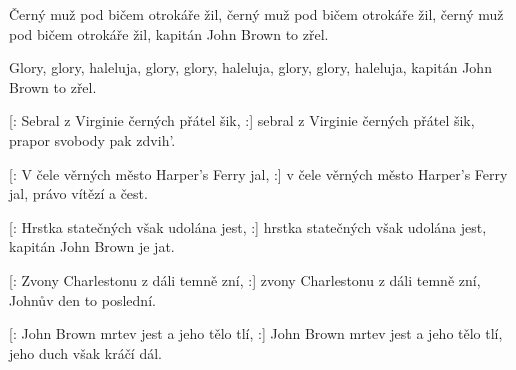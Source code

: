 
\beginverse{}
Černý muž pod bičem otrokáře žil,
černý muž pod bičem otrokáře žil,
černý muž pod bičem otrokáře žil,
kapitán John Brown to zřel.
\endverse{}

\beginchorus{}
Glory, glory, haleluja, glory, glory, haleluja,
glory, glory, haleluja, kapitán John Brown to zřel.
\endchorus{}

\beginverse{}
[: Sebral z Virginie černých přátel šik, :]
sebral z Virginie černých přátel šik,
prapor svobody pak zdvih'.
\endverse{}

\beginchorus{}
\phantom{}
\endchorus{}

\beginverse{}
[: V čele věrných město Harper's Ferry jal, :]
v čele věrných město Harper's Ferry jal,
právo vítězí a čest.
\endverse{}

\beginchorus{}
\phantom{}
\endchorus{}

\beginverse{}
[: Hrstka statečných však udolána jest, :]
hrstka statečných však udolána jest,
kapitán John Brown je jat.
\endverse{}

\beginchorus{}
\phantom{}
\endchorus{}

\beginverse{}
[: Zvony Charlestonu z dáli temně zní, :]
zvony Charlestonu z dáli temně zní,
Johnův den to poslední.
\endverse{}

\beginchorus{}
\phantom{}
\endchorus{}

\beginverse{}
[: John Brown mrtev jest a jeho tělo tlí, :]
John Brown mrtev jest a jeho tělo tlí,
jeho duch však kráčí dál.
\endverse{}

\beginchorus{}
\phantom{}
\endchorus{}

\endsong{}
